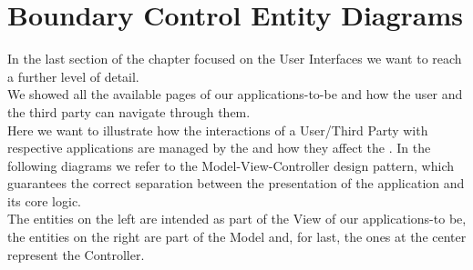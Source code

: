 \section{Boundary Control Entity Diagrams}
In the last section of the chapter focused on the User Interfaces we want to reach a further level of detail.\\
We showed all the available pages of our applications-to-be and how the user and the third party can navigate through them.\\
Here we want to illustrate how the interactions of a User/Third Party with respective applications are managed by the  and how they affect the .
In the following diagrams we refer to the Model-View-Controller design pattern, which guarantees the correct separation between the presentation of the application and its core logic.\\
The entities on the left are intended as part of the View of our applications-to be, the entities on the right are part of the Model and, for last, the ones at the center represent the Controller.

